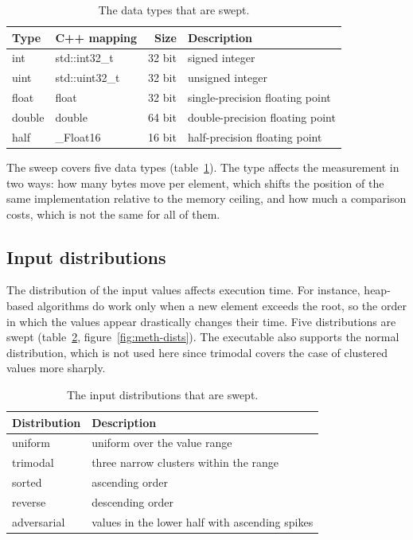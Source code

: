 \begin{table}[H]
    \centering
    \begin{tabular}{llrl}
        \toprule
        Type & C++ mapping & Size & Description \\
        \midrule
        int & std::int32\_t & 32 bit & signed integer \\
        uint & std::uint32\_t & 32 bit & unsigned integer \\
        float & float & 32 bit & single-precision floating point \\
        double & double & 64 bit & double-precision floating point \\
        half & \_Float16 & 16 bit & half-precision floating point \\
        \bottomrule
    \end{tabular}
    \caption{The data types that are swept.}
    \label{tab:dtypes}
\end{table}

The sweep covers five data types (table~\ref{tab:dtypes}). The type affects the
measurement in two ways: how many bytes move per element, which shifts the
position of the same implementation relative to the memory ceiling, and how
much a comparison costs, which is not the same for all of them.

\subsection{Input distributions}
\label{sec:meth-distributions}

The distribution of the input values affects execution time. For instance,
heap-based algorithms do work only when a new element exceeds the root, so the
order in which the values appear drastically changes their time. Five
distributions are swept (table~\ref{tab:distributions},
figure~\ref{fig:meth-dists}). The executable also supports the normal
distribution, which is not used here since trimodal covers the case of
clustered values more sharply.

\begin{table}[H]
    \centering
    \begin{tabular}{ll}
        \toprule
        Distribution & Description \\
        \midrule
        uniform & uniform over the value range \\
        trimodal & three narrow clusters within the range \\
        sorted & ascending order \\
        reverse & descending order \\
        adversarial & values in the lower half with ascending spikes \\
        \bottomrule
    \end{tabular}
    \caption{The input distributions that are swept.}
    \label{tab:distributions}
\end{table}

